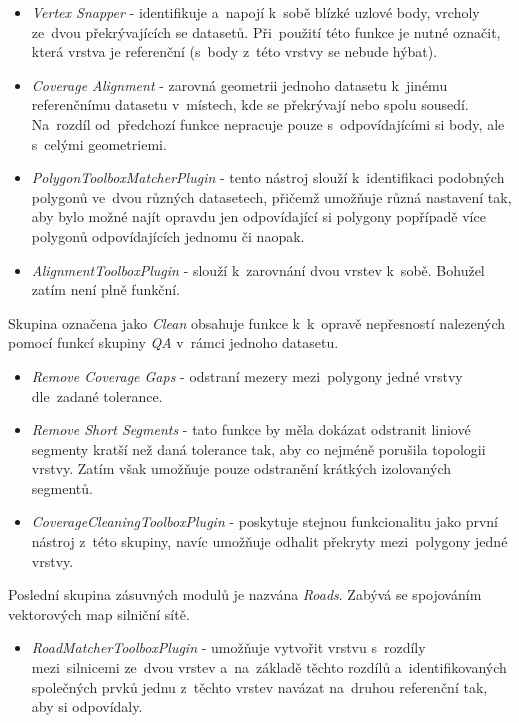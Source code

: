 \begin{itemize}
 \item \textit{Vertex Snapper} - identifikuje a~napojí k~sobě blízké uzlové
    body, vrcholy ze~dvou překrývajících se datasetů. Při~použití této funkce
    je nutné označit, která vrstva je referenční (s~body z~této vrstvy se 
    nebude hýbat).
 \item \textit{Coverage Alignment} - zarovná geometrii jednoho datasetu 
    k~jinému referenčnímu datasetu v~místech, kde se překrývají nebo spolu
    sousedí. Na~rozdíl od~předchozí funkce nepracuje pouze s~odpovídajícími
    si body, ale s~celými geometriemi.
 \item \textit{PolygonToolboxMatcherPlugin} - tento nástroj slouží k~identifikaci
    podobných polygonů ve~dvou různých datasetech, přičemž umožňuje různá 
    nastavení tak, aby bylo možné najít opravdu jen odpovídající si polygony
    popřípadě více polygonů odpovídajících jednomu či naopak. %
 \item \textit{AlignmentToolboxPlugin} - slouží k~zarovnání dvou vrstev k~sobě.
    Bohužel zatím není plně funkční. %
\end{itemize}

Skupina označena jako \textit{Clean} obsahuje funkce k~k~opravě nepřesností
nalezených pomocí funkcí skupiny \textit{QA} v~rámci jednoho datasetu.

\begin{itemize}
 \item \textit{Remove Coverage Gaps} - odstraní mezery mezi~polygony jedné
    vrstvy dle~zadané tolerance.
 \item \textit{Remove Short Segments} - tato funkce by měla dokázat odstranit
    liniové segmenty kratší než daná tolerance tak, aby co nejméně porušila 
    topologii vrstvy. Zatím však umožňuje pouze odstranění krátkých izolovaných
    segmentů.
 \item \textit{CoverageCleaningToolboxPlugin} - poskytuje stejnou funkcionalitu
    jako první nástroj z~této skupiny, navíc umožňuje odhalit překryty 
    mezi~polygony jedné vrstvy.
\end{itemize}

Poslední skupina zásuvných modulů je nazvána \textit{Roads}. Zabývá se 
spojováním vektorových map silniční sítě.

\begin{itemize}
 \item \textit{RoadMatcherToolboxPlugin} - umožňuje vytvořit vrstvu s~rozdíly
    mezi~silnicemi ze~dvou vrstev a~na~základě těchto rozdílů a~identifikovaných
    společných prvků jednu z~těchto vrstev navázat na~druhou referenční tak, 
    aby si odpovídaly.
\end{itemize}


